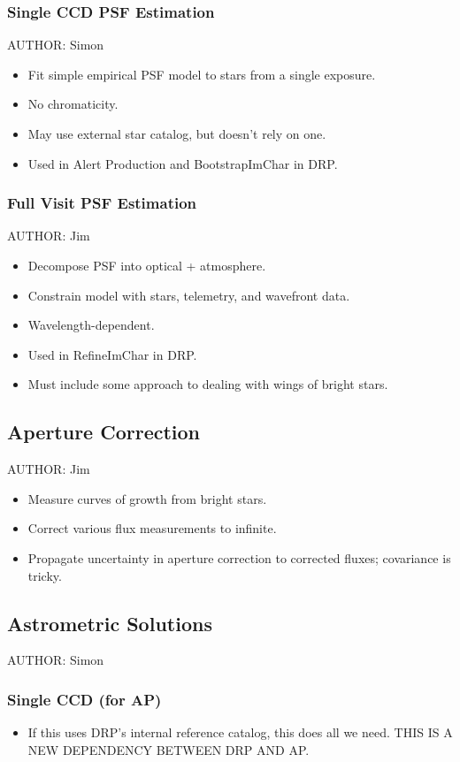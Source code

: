 \subsubsection{Single CCD PSF Estimation}
AUTHOR: Simon
\begin{itemize}
\item Fit simple empirical PSF model to stars from a single exposure.
\item No chromaticity.
\item May use external star catalog, but doesn't rely on one.
\item Used in Alert Production and BootstrapImChar in DRP.
\end{itemize}

\subsubsection{Full Visit PSF Estimation}
AUTHOR: Jim
\begin{itemize}
\item Decompose PSF into optical + atmosphere.
\item Constrain model with stars, telemetry, and wavefront data.
\item Wavelength-dependent.
\item Used in RefineImChar in DRP.
\item Must include some approach to dealing with wings of bright stars.
\end{itemize}

\subsection{Aperture Correction}
AUTHOR: Jim
\begin{itemize}
\item Measure curves of growth from bright stars.
\item Correct various flux measurements to infinite.
\item Propagate uncertainty in aperture correction to corrected fluxes; covariance is tricky.
\end{itemize}

\subsection{Astrometric Solutions}
AUTHOR: Simon
\subsubsection{Single CCD (for AP)}
\begin{itemize}
\item If this uses DRP's internal reference catalog, this does all we need. THIS IS A NEW DEPENDENCY BETWEEN DRP AND AP.
\end{itemize}
